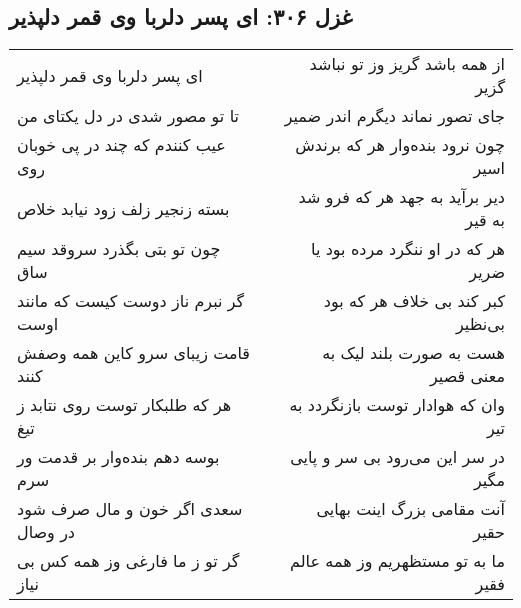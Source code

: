 \begin{center}
\section*{غزل ۳۰۶: ای پسر دلربا وی قمر دلپذیر}
\label{sec:306}
\begin{longtable}{l p{0.5cm} r}
ای پسر دلربا وی قمر دلپذیر
&&
از همه باشد گریز وز تو نباشد گزیر
\\
تا تو مصور شدی در دل یکتای من
&&
جای تصور نماند دیگرم اندر ضمیر
\\
عیب کنندم که چند در پی خوبان روی
&&
چون نرود بنده‌وار هر که برندش اسیر
\\
بسته زنجیر زلف زود نیابد خلاص
&&
دیر برآید به جهد هر که فرو شد به قیر
\\
چون تو بتی بگذرد سروقد سیم ساق
&&
هر که در او ننگرد مرده بود یا ضریر
\\
گر نبرم ناز دوست کیست که مانند اوست
&&
کبر کند بی خلاف هر که بود بی‌نظیر
\\
قامت زیبای سرو کاین همه وصفش کنند
&&
هست به صورت بلند لیک به معنی قصیر
\\
هر که طلبکار توست روی نتابد ز تیغ
&&
وان که هوادار توست بازنگردد به تیر
\\
بوسه دهم بنده‌وار بر قدمت ور سرم
&&
در سر این می‌رود بی سر و پایی مگیر
\\
سعدی اگر خون و مال صرف شود در وصال
&&
آنت مقامی بزرگ اینت بهایی حقیر
\\
گر تو ز ما فارغی وز همه کس بی نیاز
&&
ما به تو مستظهریم وز همه عالم فقیر
\\
\end{longtable}
\end{center}
